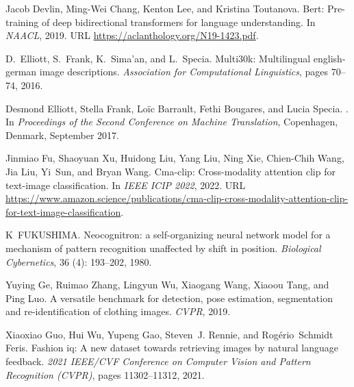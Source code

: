 \documentclass{bmvc2k}
\begin{document}
\begin{thebibliography}{63}
Jacob Devlin, Ming-Wei Chang, Kenton Lee, and Kristina Toutanova.
\newblock Bert: Pre-training of deep bidirectional transformers for language
  understanding.
\newblock In \emph{NAACL}, 2019.
\newblock URL \url{https://aclanthology.org/N19-1423.pdf}.

D.~{Elliott}, S.~{Frank}, K.~{Sima'an}, and L.~{Specia}.
\newblock Multi30k: Multilingual english-german image descriptions.
\newblock \emph{Association for Computational Linguistics}, pages 70--74, 2016.

Desmond Elliott, Stella Frank, Lo\"{i}c Barrault, Fethi Bougares, and Lucia
  Specia.
.
\newblock In \emph{Proceedings of the Second Conference on Machine
  Translation}, Copenhagen, Denmark, September 2017.

Jinmiao Fu, Shaoyuan Xu, Huidong Liu, Yang Liu, Ning Xie, Chien-Chih Wang, Jia
  Liu, Yi~Sun, and Bryan Wang.
\newblock Cma-clip: Cross-modality attention clip for text-image
  classification.
\newblock In \emph{IEEE ICIP 2022}, 2022.
\newblock URL
  \url{https://www.amazon.science/publications/cma-clip-cross-modality-attention-clip-for-text-image-classification}.

K~FUKUSHIMA.
\newblock Neocognitron: a self-organizing neural network model for a mechanism
  of pattern recognition unaffected by shift in position.
\newblock \emph{Biological Cybernetics}, 36 (4): 193--202,
  1980.

Yuying Ge, Ruimao Zhang, Lingyun Wu, Xiaogang Wang, Xiaoou Tang, and Ping Luo.
\newblock A versatile benchmark for detection, pose estimation, segmentation
  and re-identification of clothing images.
\newblock \emph{CVPR}, 2019.

Xiaoxiao Guo, Hui Wu, Yupeng Gao, Steven~J. Rennie, and Rog{\'e}rio~Schmidt
  Feris.
\newblock Fashion iq: A new dataset towards retrieving images by natural
  language feedback.
\newblock \emph{2021 IEEE/CVF Conference on Computer Vision and Pattern
  Recognition (CVPR)}, pages 11302--11312, 2021.


\end{thebibliography}
\end{document}
